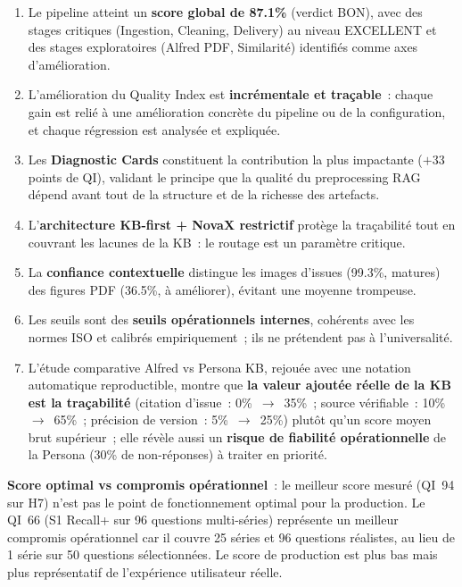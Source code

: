 \begin{enumerate}
  \item Le pipeline atteint un \textbf{score global de 87.1\%} (verdict BON), avec des stages critiques (Ingestion, Cleaning, Delivery) au niveau EXCELLENT et des stages exploratoires (Alfred PDF, Similarité) identifiés comme axes d'amélioration.
  
  \item L'amélioration du Quality Index est \textbf{incrémentale et traçable}~: chaque gain est relié à une amélioration concrète du pipeline ou de la configuration, et chaque régression est analysée et expliquée.
  
  \item Les \textbf{Diagnostic Cards} constituent la contribution la plus impactante ($+33$ points de QI), validant le principe que la qualité du preprocessing RAG dépend avant tout de la structure et de la richesse des artefacts.
  
  \item L'\textbf{architecture KB-first + NovaX restrictif} protège la traçabilité tout en couvrant les lacunes de la KB~: le routage est un paramètre critique.
  
  \item La \textbf{confiance contextuelle} distingue les images d'issues (99.3\%, matures) des figures PDF (36.5\%, à améliorer), évitant une moyenne trompeuse.
  
  \item Les seuils sont des \textbf{seuils opérationnels internes}, cohérents avec les normes ISO et calibrés empiriquement~; ils ne prétendent pas à l'universalité.
  
  \item L'étude comparative Alfred vs Persona KB, rejouée avec une notation automatique reproductible, montre que \textbf{la valeur ajoutée réelle de la KB est la traçabilité} (citation d'issue~: 0\%~$\to$~35\%~; source vérifiable~: 10\%~$\to$~65\%~; précision de version~: 5\%~$\to$~25\%) plutôt qu'un score moyen brut supérieur~; elle révèle aussi un \textbf{risque de fiabilité opérationnelle} de la Persona (30\% de non-réponses) à traiter en priorité.
\end{enumerate}

\textbf{Score optimal vs compromis opérationnel}~: le meilleur score mesuré (QI~94 sur H7) n'est pas le point de fonctionnement optimal pour la production. Le QI~66 (S1 Recall+ sur 96 questions multi-séries) représente un meilleur compromis opérationnel car il couvre 25 séries et 96 questions réalistes, au lieu de 1 série sur 50 questions sélectionnées. Le score de production est plus bas mais plus représentatif de l'expérience utilisateur réelle.
